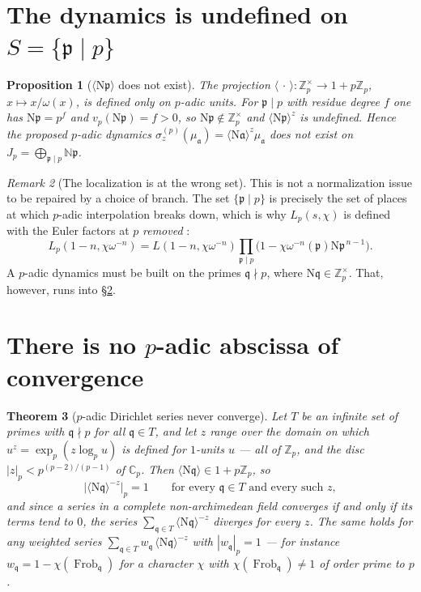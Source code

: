 \documentclass[11pt]{amsart}
\numberwithin{equation}{section}
\newtheorem{theorem}{Theorem}[section]
\newtheorem{proposition}[theorem]{Proposition}
\theoremstyle{definition}
\theoremstyle{remark}
\newtheorem{remark}[theorem]{Remark}
\newcommand{\Z}{\mathbb{Z}}
\newcommand{\N}{\mathbb{N}}
\newcommand{\Cp}{\mathbb{C}_p}
\newcommand{\pp}{\mathfrak{p}}
\newcommand{\qq}{\mathfrak{q}}
\newcommand{\aaa}{\mathfrak{a}}
\newcommand{\Ns}{\mathrm{N}}
\newcommand{\Frob}{\operatorname{Frob}}
\begin{document}
\section{The dynamics is undefined on $S=\{\pp\mid p\}$}

\begin{proposition}[$\langle\Ns\pp\rangle$ does not exist]\label{prop:undefined}
The projection $\langle\,\cdot\,\rangle:\Z_p^\times\to1+p\Z_p$, $x\mapsto x/\omega(x)$, is
defined only on $p$-adic units. For $\pp\mid p$ with residue degree $f$ one has
$\Ns\pp=p^{f}$ and $v_p(\Ns\pp)=f>0$, so $\Ns\pp\notin\Z_p^\times$ and
$\langle\Ns\pp\rangle^z$ is undefined. Hence the proposed $p$-adic dynamics
$\sigma^{(p)}_z(\mu_\aaa)=\langle\Ns\aaa\rangle^z\mu_\aaa$ does not exist on
$J_p=\bigoplus_{\pp\mid p}\N\pp$.
\end{proposition}

\begin{remark}[The localization is at the wrong set]\label{rem:wrongset}
This is not a normalization issue to be repaired by a choice of branch. The set
$\{\pp\mid p\}$ is precisely the set of places at which $p$-adic interpolation breaks down,
which is why $L_p(s,\chi)$ is defined with the Euler factors at $p$ \emph{removed}
\cite{Washington}:
\[
L_p(1-n,\chi\omega^{-n})=L(1-n,\chi\omega^{-n})\prod_{\pp\mid p}\bigl(1-\chi\omega^{-n}(\pp)\Ns\pp^{\,n-1}\bigr).
\]
A $p$-adic dynamics must be built on the primes $\qq\nmid p$, where $\Ns\qq\in\Z_p^\times$.
That, however, runs into \S\ref{sec:noabscissa}.
\end{remark}

\section{There is no $p$-adic abscissa of convergence}\label{sec:noabscissa}

\begin{theorem}[$p$-adic Dirichlet series never converge]\label{thm:noabscissa}
Let $T$ be an infinite set of primes with $\qq\nmid p$ for all $\qq\in T$, and let
$z$ range over the domain on which $u^z=\exp_p(z\log_pu)$ is defined for $1$-units $u$ ---
all of $\Z_p$, and the disc $|z|_p<p^{(p-2)/(p-1)}$ of $\Cp$. Then
$\langle\Ns\qq\rangle\in1+p\Z_p$, so
\[
\bigl|\langle\Ns\qq\rangle^{-z}\bigr|_p=1\qquad\text{for every }\qq\in T\text{ and every such }z,
\]
and since a series in a complete non-archimedean field converges if and only if its terms
tend to $0$, the series $\sum_{\qq\in T}\langle\Ns\qq\rangle^{-z}$ diverges for every $z$.
The same holds for any weighted series
$\sum_{\qq\in T}w_\qq\,\langle\Ns\qq\rangle^{-z}$ with $|w_\qq|_p=1$ --- for instance
$w_\qq=1-\chi(\Frob_\qq)$ for a character $\chi$ with $\chi(\Frob_\qq)\ne1$ of order prime
to $p$.
\end{theorem}
\end{document}
